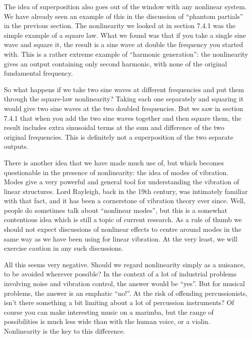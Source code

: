   The idea of superposition also goes out of the window with any nonlinear 
  system. We have already seen an example of this in the discussion of “phantom 
  partials” in the previous section. The nonlinearity we looked at in section 
  7.4.1 was the simple example of a square law. What we found was that if you 
  take a single sine wave and square it, the result is a sine wave at double 
  the frequency you started with. This is a rather extreme example of 
  ``harmonic generation'': the nonlinearity gives an output containing only 
  second harmonic, with none of the original fundamental frequency. 

  So what happens if we take two sine waves at different frequencies and put 
  them through the square-law nonlinearity? Taking each one separately and 
  squaring it would give two sine waves at the two doubled frequencies. But we 
  saw in section 7.4.1 that when you add the two sine waves together and then 
  square them, the result includes extra sinusoidal terms at the sum and 
  difference of the two original frequencies. This is definitely not a 
  superposition of the two separate outputs. 

  There is another idea that we have made much use of, but which becomes 
  questionable in the presence of nonlinearity: the idea of modes of vibration. 
  Modes give a very powerful and general tool for understanding the vibration 
  of linear structures. Lord Rayleigh, back in the 19th century, was intimately 
  familiar with that fact, and it has been a cornerstone of vibration theory 
  ever since. Well, people do sometimes talk about “nonlinear modes”, but this 
  is a somewhat contentious idea which is still a topic of current research. As 
  a rule of thumb we should not expect discussions of nonlinear effects to 
  centre around modes in the same way as we have been using for linear 
  vibration. At the very least, we will exercise caution in any such 
  discussions. 

  All this seems very negative. Should we regard nonlinearity simply as a 
  nuisance, to be avoided wherever possible? In the context of a lot of 
  industrial problems involving noise and vibration control, the answer would 
  be “yes”. But for musical problems, the answer is an emphatic “no!”. At the 
  risk of offending percussionists, isn’t there something a bit limiting about 
  a lot of percussion instruments? Of course you can make interesting music on 
  a marimba, but the range of possibilities is much less wide than with the 
  human voice, or a violin. Nonlinearity is the key to this difference. 

